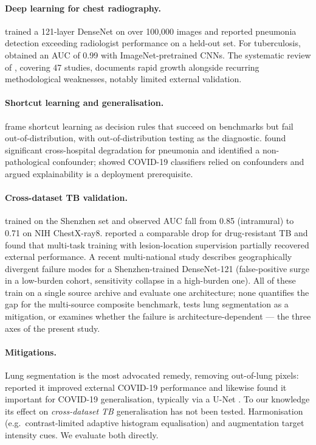 \documentclass{article}
\begin{document}
\paragraph{Deep learning for chest radiography.}
\citet{rajpurkar2017chexnet} trained a 121-layer DenseNet on over 100{,}000 images and reported
pneumonia detection exceeding radiologist performance on a held-out set. For tuberculosis,
\citet{lakhani2017deep} obtained an AUC of 0.99 with ImageNet-pretrained CNNs. The systematic
review of \citet{hansun2023machine}, covering 47 studies, documents rapid growth alongside
recurring methodological weaknesses, notably limited external validation.

\paragraph{Shortcut learning and generalisation.}
\citet{geirhos2020shortcut} frame shortcut learning as decision rules that succeed on benchmarks
but fail out-of-distribution, with out-of-distribution testing as the diagnostic.
\citet{zech2018variable} found significant cross-hospital degradation for pneumonia and identified
a non-pathological confounder; \citet{degrave2021ai} showed COVID-19 classifiers relied on
confounders and argued explainability is a deployment prerequisite.

\paragraph{Cross-dataset TB validation.}
\citet{sathitratanacheewin2020deep} trained on the Shenzhen set and observed AUC fall from 0.85
(intramural) to 0.71 on NIH ChestX-ray8. \citet{karki2022generalization} reported a comparable drop
for drug-resistant TB and found that multi-task training with lesion-location supervision partially
recovered external performance. A recent multi-national study \citep{shuaibu2026geographic}
describes geographically divergent failure modes for a Shenzhen-trained DenseNet-121
(false-positive surge in a low-burden cohort, sensitivity collapse in a high-burden one). All of
these train on a single source archive and evaluate one architecture; none quantifies the gap for
the multi-source composite benchmark, tests lung segmentation as a mitigation, or examines whether
the failure is architecture-dependent --- the three axes of the present study.

\paragraph{Mitigations.}
Lung segmentation is the most advocated remedy, removing out-of-lung pixels:
\citet{bassi2022covid} reported it improved external COVID-19 performance and
\citet{teixeira2021impact} likewise found it important for COVID-19 generalisation, typically via a
U-Net \citep{ronneberger2015unet}. To our knowledge its effect on \emph{cross-dataset TB}
generalisation has not been tested. Harmonisation (e.g.\ contrast-limited adaptive histogram
equalisation) and augmentation target intensity cues. We evaluate both directly.
\end{document}
